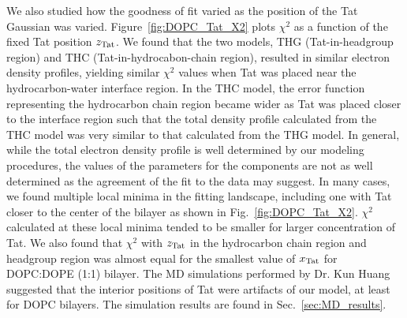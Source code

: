 We also studied how the goodness of fit varied as the position of 
the Tat Gaussian was varied. Figure~\ref{fig:DOPC_Tat_X2} plots $\chi^2$ as a 
function of the fixed Tat position $z_\textrm{Tat}$. We found that the two models,
THG (Tat-in-headgroup region) and THC (Tat-in-hydrocabon-chain region), resulted 
in similar electron density profiles, yielding similar $\chi^2$ values 
when Tat was placed near the hydrocarbon-water interface region. In the THC model, 
the error function representing the hydrocarbon chain region became wider as
Tat was placed closer to the interface region such that 
the total density profile calculated from the THC model was very similar to that calculated 
from the THG model.
In general, while the total electron density profile is well determined by 
our modeling procedures, the values of the parameters for the components are 
not as well determined as the agreement of the fit to the data may suggest. 
In many cases, we found multiple local minima in the fitting landscape, 
including one with Tat closer to the center of the bilayer as
shown in Fig.~\ref{fig:DOPC_Tat_X2}. $\chi^2$ calculated at these local minima 
tended to be smaller for larger concentration of Tat. We also found
that $\chi^2$ with $z_\textrm{Tat}$ in the hydrocarbon chain region and headgroup
region was almost equal for the smallest value of $x_\textrm{Tat}$ for DOPC:DOPE (1:1)
bilayer.
The MD simulations performed by Dr. Kun Huang suggested that
the interior positions of Tat were artifacts of our model, at least for DOPC
bilayers. The simulation results are found in Sec.~\ref{sec:MD_results}.

